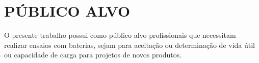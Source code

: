 \chapter{PÚBLICO ALVO} \label{cha:public_alvo}

O presente trabalho possui como público alvo profissionais que necessitam
realizar ensaios com baterias, sejam para aceitação ou determinação de
vida útil ou capacidade de carga para projetos de novos produtos.
